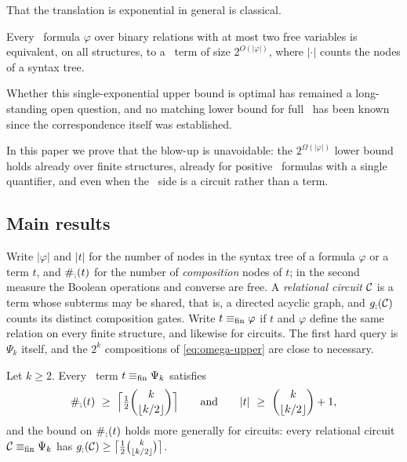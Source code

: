 That the translation is exponential in general is classical.
\begin{proposition}\label{prop:upper-translation}
Every \FOthree\ formula $\varphi$ over binary relations with at most two
free variables is
equivalent, on all structures, to a \CoR\ term of size $2^{O(|\varphi|)}$,
where $|\cdot|$ counts the nodes of a syntax tree.
\end{proposition}

Whether this single-exponential upper bound is optimal has remained a
long-standing open question, and no matching lower bound for full \CoR\ has
been known since the correspondence itself was established.

In this paper we prove that the blow-up is unavoidable: the
$2^{\Omega(|\varphi|)}$ lower bound holds already over finite structures,
already for positive \FOthree\ formulas with a single quantifier, and even
when the \CoR\ side is a circuit rather than a term.

\subsection{Main results}\label{sec:main-results}
Write $|\varphi|$ and $|t|$ for the number of nodes in the syntax tree of a
formula $\varphi$ or a term $t$, and $\#_{;}(t)$ for the number of
\emph{composition} nodes of $t$; in the second measure the Boolean
operations and converse are free. A \emph{relational circuit} $\mathcal C$ is a
term whose subterms may be shared, that is, a directed acyclic graph, and
$g_{;}(\mathcal C)$ counts its distinct composition gates. Write
$t\equiv_{\rm fin}\varphi$ if $t$ and $\varphi$ define the same relation on
every finite structure, and likewise for circuits. The first hard query is
$\Psi_k$ itself, and the $2^k$ compositions of \eqref{eq:omega-upper} are
close to necessary.

\begin{theorem}\label{main:omega}
Let $k\ge2$. Every \CoR\ term $t\equiv_{\rm fin}\Psi_k$ satisfies
\[
 \cost{t}\ \ge\ \Bigl\lceil\tfrac12\binom{k}{\lfloor k/2\rfloor}\Bigr\rceil
 \qquad\text{and}\qquad
 |t|\ \ge\ \binom{k}{\lfloor k/2\rfloor}+1,
\]
and the bound on $\#_{;}(t)$ holds more generally for circuits: every
relational
circuit $\mathcal C\equiv_{\rm fin}\Psi_k$ has
$g_{;}(\mathcal C)\ge\bigl\lceil\frac12\binom{k}{\lfloor k/2\rfloor}\bigr\rceil$.
\end{theorem}

